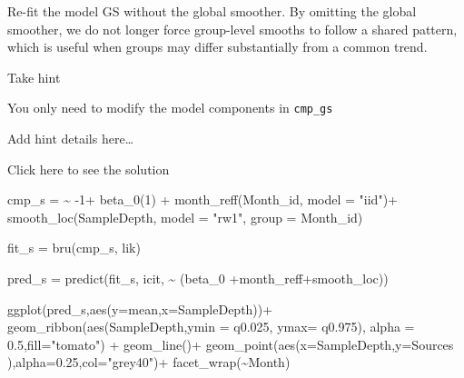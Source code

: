 \documentclass[
  letterpaper,
  DIV=11,
  numbers=noendperiod]{scrartcl}
\newenvironment{Shaded}{\begin{snugshade}}{\end{snugshade}}
\newcommand{\AttributeTok}[1]{\textcolor[rgb]{0.40,0.45,0.13}{#1}}
\newcommand{\DecValTok}[1]{\textcolor[rgb]{0.68,0.00,0.00}{#1}}
\newcommand{\ErrorTok}[1]{\textcolor[rgb]{0.68,0.00,0.00}{#1}}
\newcommand{\FloatTok}[1]{\textcolor[rgb]{0.68,0.00,0.00}{#1}}
\newcommand{\FunctionTok}[1]{\textcolor[rgb]{0.28,0.35,0.67}{#1}}
\newcommand{\NormalTok}[1]{\textcolor[rgb]{0.00,0.23,0.31}{#1}}
\newcommand{\OtherTok}[1]{\textcolor[rgb]{0.00,0.23,0.31}{#1}}
\newcommand{\SpecialCharTok}[1]{\textcolor[rgb]{0.37,0.37,0.37}{#1}}
\newcommand{\StringTok}[1]{\textcolor[rgb]{0.13,0.47,0.30}{#1}}
\begin{document}
\begin{tcolorbox}[enhanced jigsaw, titlerule=0mm, breakable, opacitybacktitle=0.6, rightrule=.15mm, left=2mm, arc=.35mm, toptitle=1mm, coltitle=black, colframe=quarto-callout-warning-color-frame, opacityback=0, colback=white, bottomrule=.15mm, leftrule=.75mm, colbacktitle=quarto-callout-warning-color!10!white, bottomtitle=1mm, title={Task}, toprule=.15mm]

Re-fit the model GS without the global smoother. By omitting the global
smoother, we do not longer force group-level smooths to follow a shared
pattern, which is useful when groups may differ substantially from a
common trend.

Take hint

You only need to modify the model components in \texttt{cmp\_gs}

Add hint details here\ldots{}

Click here to see the solution

\begin{Shaded}
\begin{Highlighting}[]
\NormalTok{cmp\_s }\OtherTok{=}  \ErrorTok{\textasciitilde{}} \SpecialCharTok{{-}}\DecValTok{1}\SpecialCharTok{+} \FunctionTok{beta\_0}\NormalTok{(}\DecValTok{1}\NormalTok{) }\SpecialCharTok{+}
  \FunctionTok{month\_reff}\NormalTok{(Month\_id, }\AttributeTok{model =} \StringTok{"iid"}\NormalTok{)}\SpecialCharTok{+}
  \FunctionTok{smooth\_loc}\NormalTok{(SampleDepth, }\AttributeTok{model =} \StringTok{"rw1"}\NormalTok{, }\AttributeTok{group =}\NormalTok{ Month\_id)}

\NormalTok{fit\_s }\OtherTok{=} \FunctionTok{bru}\NormalTok{(cmp\_s, lik) }

\NormalTok{pred\_s }\OtherTok{=} \FunctionTok{predict}\NormalTok{(fit\_s, icit, }\SpecialCharTok{\textasciitilde{}}\NormalTok{ (beta\_0 }\SpecialCharTok{+}\NormalTok{month\_reff}\SpecialCharTok{+}\NormalTok{smooth\_loc))}

\FunctionTok{ggplot}\NormalTok{(pred\_s,}\FunctionTok{aes}\NormalTok{(}\AttributeTok{y=}\NormalTok{mean,}\AttributeTok{x=}\NormalTok{SampleDepth))}\SpecialCharTok{+}
  \FunctionTok{geom\_ribbon}\NormalTok{(}\FunctionTok{aes}\NormalTok{(SampleDepth,}\AttributeTok{ymin =}\NormalTok{ q0}\FloatTok{.025}\NormalTok{, }\AttributeTok{ymax=}\NormalTok{ q0}\FloatTok{.975}\NormalTok{), }\AttributeTok{alpha =} \FloatTok{0.5}\NormalTok{,}\AttributeTok{fill=}\StringTok{"tomato"}\NormalTok{) }\SpecialCharTok{+}
  \FunctionTok{geom\_line}\NormalTok{()}\SpecialCharTok{+}
  \FunctionTok{geom\_point}\NormalTok{(}\FunctionTok{aes}\NormalTok{(}\AttributeTok{x=}\NormalTok{SampleDepth,}\AttributeTok{y=}\NormalTok{Sources ),}\AttributeTok{alpha=}\FloatTok{0.25}\NormalTok{,}\AttributeTok{col=}\StringTok{"grey40"}\NormalTok{)}\SpecialCharTok{+}
  \FunctionTok{facet\_wrap}\NormalTok{(}\SpecialCharTok{\textasciitilde{}}\NormalTok{Month)}
\end{Highlighting}
\end{Shaded}


\end{tcolorbox}
\end{document}
